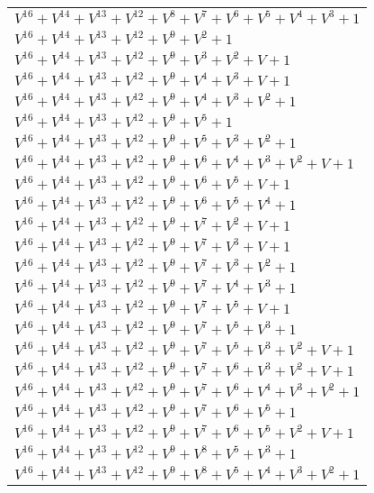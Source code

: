 \documentclass[12pt]{article}
\begin{document}
\begin{adjustwidth}{-4cm}{}
\begin{center}
\begin{longtable}{|l|}
$V^{16}  +V^{14}  +V^{13}  +V^{12}  +V^{8}  +V^{7}  +V^{6}  +V^{5}  +V^{4}  +V^{3}  + 1$ \\
$V^{16}  +V^{14}  +V^{13}  +V^{12}  +V^{9}  +V^{2}  + 1$ \\
$V^{16}  +V^{14}  +V^{13}  +V^{12}  +V^{9}  +V^{3}  +V^{2}  + V + 1$ \\
$V^{16}  +V^{14}  +V^{13}  +V^{12}  +V^{9}  +V^{4}  +V^{3}  + V + 1$ \\
$V^{16}  +V^{14}  +V^{13}  +V^{12}  +V^{9}  +V^{4}  +V^{3}  +V^{2}  + 1$ \\
$V^{16}  +V^{14}  +V^{13}  +V^{12}  +V^{9}  +V^{5}  + 1$ \\
$V^{16}  +V^{14}  +V^{13}  +V^{12}  +V^{9}  +V^{5}  +V^{3}  +V^{2}  + 1$ \\
$V^{16}  +V^{14}  +V^{13}  +V^{12}  +V^{9}  +V^{6}  +V^{4}  +V^{3}  +V^{2}  + V + 1$ \\
$V^{16}  +V^{14}  +V^{13}  +V^{12}  +V^{9}  +V^{6}  +V^{5}  + V + 1$ \\
$V^{16}  +V^{14}  +V^{13}  +V^{12}  +V^{9}  +V^{6}  +V^{5}  +V^{4}  + 1$ \\
$V^{16}  +V^{14}  +V^{13}  +V^{12}  +V^{9}  +V^{7}  +V^{2}  + V + 1$ \\
$V^{16}  +V^{14}  +V^{13}  +V^{12}  +V^{9}  +V^{7}  +V^{3}  + V + 1$ \\
$V^{16}  +V^{14}  +V^{13}  +V^{12}  +V^{9}  +V^{7}  +V^{3}  +V^{2}  + 1$ \\
$V^{16}  +V^{14}  +V^{13}  +V^{12}  +V^{9}  +V^{7}  +V^{4}  +V^{3}  + 1$ \\
$V^{16}  +V^{14}  +V^{13}  +V^{12}  +V^{9}  +V^{7}  +V^{5}  + V + 1$ \\
$V^{16}  +V^{14}  +V^{13}  +V^{12}  +V^{9}  +V^{7}  +V^{5}  +V^{3}  + 1$ \\
$V^{16}  +V^{14}  +V^{13}  +V^{12}  +V^{9}  +V^{7}  +V^{5}  +V^{3}  +V^{2}  + V + 1$ \\
$V^{16}  +V^{14}  +V^{13}  +V^{12}  +V^{9}  +V^{7}  +V^{6}  +V^{3}  +V^{2}  + V + 1$ \\
$V^{16}  +V^{14}  +V^{13}  +V^{12}  +V^{9}  +V^{7}  +V^{6}  +V^{4}  +V^{3}  +V^{2}  + 1$ \\
$V^{16}  +V^{14}  +V^{13}  +V^{12}  +V^{9}  +V^{7}  +V^{6}  +V^{5}  + 1$ \\
$V^{16}  +V^{14}  +V^{13}  +V^{12}  +V^{9}  +V^{7}  +V^{6}  +V^{5}  +V^{2}  + V + 1$ \\
$V^{16}  +V^{14}  +V^{13}  +V^{12}  +V^{9}  +V^{8}  +V^{5}  +V^{3}  + 1$ \\
$V^{16}  +V^{14}  +V^{13}  +V^{12}  +V^{9}  +V^{8}  +V^{5}  +V^{4}  +V^{3}  +V^{2}  + 1$ \\

\end{longtable}
\end{center}
\end{adjustwidth}
\end{document}
